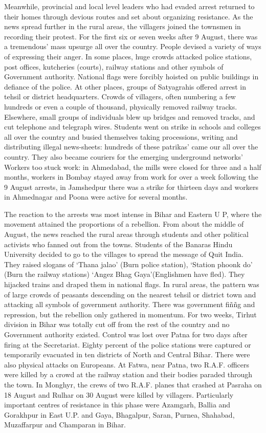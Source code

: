 Meanwhile, provincial and local level leaders who had evaded arrest returned to their homes through devious routes and set about organizing resistance. As the news spread further in the rural areas, the villagers joined the townsmen in recording their protest. For the first six or seven weeks after 9 August, there was a tremendous' mass upsurge all over the country. People devised a variety of ways of expressing their anger. In some places, huge crowds attacked police stations, post offices, kutcheries (courts), railway stations and other symbols of Government authority. National flags were forcibly hoisted on public buildings in defiance of the police. At other places, groups of Satyagrahis offered arrest in tehsil or district headquarters. Crowds of villagers, often numbering a few hundreds or even a couple of thousand, physically removed railway tracks. Elsewhere, small groups of individuals blew up bridges and removed tracks, and cut telephone and telegraph wires. Students went on strike in schools and colleges all over the country and busied themselves taking processions, writing and distributing illegal news-sheets: hundreds of these patrikas' came our all over the country. They also became couriers for the emerging underground networks' Workers too stuck work: in Ahmedabad, the mills were closed for three and a half months, workers in Bombay stayed away from work for over a week following the 9 August arrests, in Jamshedpur there was a strike for thirteen days and workers in Ahmednagar and Poona were active for several months.

The reaction to the arrests was most intense in Bihar and Eastern U P, where the movement attained the proportions of a rebellion. From about the middle of August, the news reached the rural areas through students and other political activists who fanned out from the towns. Students of the Banaras Hindu University decided to go to the villages to spread the message of Quit India. They raised slogans of `Thana jalao' (Burn police station), `Station phoonk do' (Burn the railway stations) `Angez Bhag Gaya'(Englishmen have fled). They hijacked trains and draped them in national flags. In rural areas, the pattern was of large crowds of peasants descending on the nearest tehsil or district town and attacking all symbols of government authority. There was government fiññg and repression, but the rebellion only gathered in momentum. For two weeks, Tirhut division in Bihar was totally cut off from the rest of the country and no Government authority existed. Control was lost over Patna for two days after firing at the Secretariat. Eighty percent of the police stations were captured or temporarily evacuated in ten districts of North and Central Bihar. There were also physical attacks on Europeans. At Fatwa, near Patna, two R.A.F. officers were killed by a crowd at the railway station and their bodies paraded through the town. In Monghyr, the crews of two R.A.F. planes that crashed at Pasraha on 18 August and Rulhar on 30 August were killed by villagers. Particularly important centres of resistance in this phase were Azamgarh, Ballia and Gorakhpur in East U.P. and Gaya, Bhagalpur, Saran, Purnea, Shahabad, Muzaffarpur and Champaran in Bihar.

